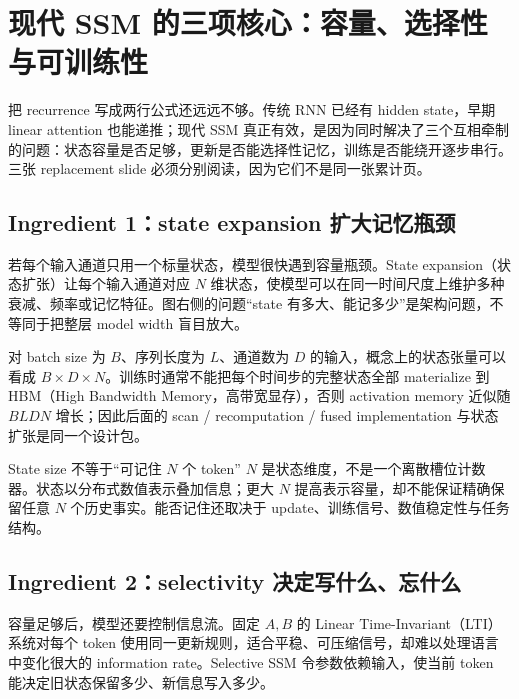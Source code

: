 \section{现代 SSM 的三项核心：容量、选择性与可训练性}

把 recurrence 写成两行公式还远远不够。传统 RNN 已经有 hidden state，早期 linear attention 也能递推；现代 SSM 真正有效，是因为同时解决了三个互相牵制的问题：状态容量是否足够，更新是否能选择性记忆，训练是否能绕开逐步串行。三张 replacement slide 必须分别阅读，因为它们不是同一张累计页。

\subsection{Ingredient 1：state expansion 扩大记忆瓶颈}

若每个输入通道只用一个标量状态，模型很快遇到容量瓶颈。State expansion（状态扩张）让每个输入通道对应 $N$ 维状态，使模型可以在同一时间尺度上维护多种衰减、频率或记忆特征。图右侧的问题“state 有多大、能记多少”是架构问题，不等同于把整层 model width 盲目放大。


对 batch size 为 $B$、序列长度为 $L$、通道数为 $D$ 的输入，概念上的状态张量可以看成 $B\times D\times N$。训练时通常不能把每个时间步的完整状态全部 materialize 到 HBM（High Bandwidth Memory，高带宽显存），否则 activation memory 近似随 $BLDN$ 增长；因此后面的 scan / recomputation / fused implementation 与状态扩张是同一个设计包。

\begin{knowledgebox}{State size 不等于“可记住 $N$ 个 token”}
$N$ 是状态维度，不是一个离散槽位计数器。状态以分布式数值表示叠加信息；更大 $N$ 提高表示容量，却不能保证精确保留任意 $N$ 个历史事实。能否记住还取决于 update、训练信号、数值稳定性与任务结构。
\end{knowledgebox}

\subsection{Ingredient 2：selectivity 决定写什么、忘什么}

容量足够后，模型还要控制信息流。固定 $A,B$ 的 Linear Time-Invariant（LTI）系统对每个 token 使用同一更新规则，适合平稳、可压缩信号，却难以处理语言中变化很大的 information rate。Selective SSM 令参数依赖输入，使当前 token 能决定旧状态保留多少、新信息写入多少。


